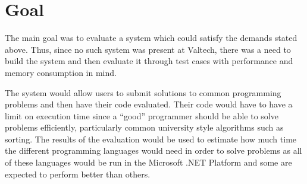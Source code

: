 \section{Goal}
The main goal was to evaluate a system which could satisfy the demands stated above. Thus, since no such system was present at Valtech, there was a need to build the system and then evaluate it through test cases with performance and memory consumption in mind.

The system would allow users to submit solutions to common programming problems and then have their code evaluated. Their code would have to have a limit on execution time since a ``good'' programmer should be able to solve problems efficiently, particularly common university style algorithms such as sorting. The results of the evaluation would be used to estimate how much time the different programming languages would need in order to solve problems as all of these languages would be run in the Microsoft .NET Platform and some are expected to perform better than others.
